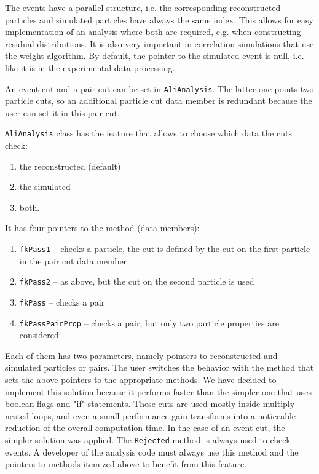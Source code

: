 \documentclass[12pt,a4paper,twoside]{article}
\begin{document}
{The events have a parallel structure, i.e. the corresponding
reconstructed particles and simulated particles have always the same index.
This allows for easy implementation of an analysis where both
are required, e.g. when constructing residual distributions.
It is also very important in correlation simulations 
that use the weight algorithm\cite{CH6Ref:Weights}. 
By default, the pointer to the simulated event is null, 
i.e. like it is in the experimental data processing.

An event cut and a pair cut can be set in \texttt{AliAnalysis}.
The latter one points two particle cuts, so
an additional particle cut data member is redundant
because the user can set it in this pair cut.

\texttt{AliAnalysis} class has the feature that allows to choose
which data the cuts check:
\begin{enumerate}
\item the reconstructed (default)
\item the simulated 
\item both.
\end{enumerate}
% 
It has four pointers to the  method (data members):
\begin{enumerate}
\item \texttt{fkPass1} -- checks a particle, the cut is defined by the 
  cut on the first particle in the pair cut data member
\item \texttt{fkPass2} -- as above, but the cut on the second particle is used
\item \texttt{fkPass}  -- checks a pair
\item \texttt{fkPassPairProp} -- checks a pair, but only two particle properties
  are considered
\end{enumerate}
Each of them has two parameters, namely pointers to 
reconstructed and simulated particles or pairs.
The user switches the behavior with the
method that sets the above pointers to the appropriate methods. 
We have decided to implement
this solution because it performs faster than the simpler one that uses
boolean flags and "if" statements. These cuts are used mostly inside 
multiply nested loops, and even a small performance gain transforms 
into a noticeable reduction of the overall computation time.
In the case of an event cut, the simpler solution was applied.
The \texttt{Rejected} method is always used to check events.
A developer of the analysis code must always use this method and 
the pointers to methods itemized above to benefit from this feature.

}
\end{document}
